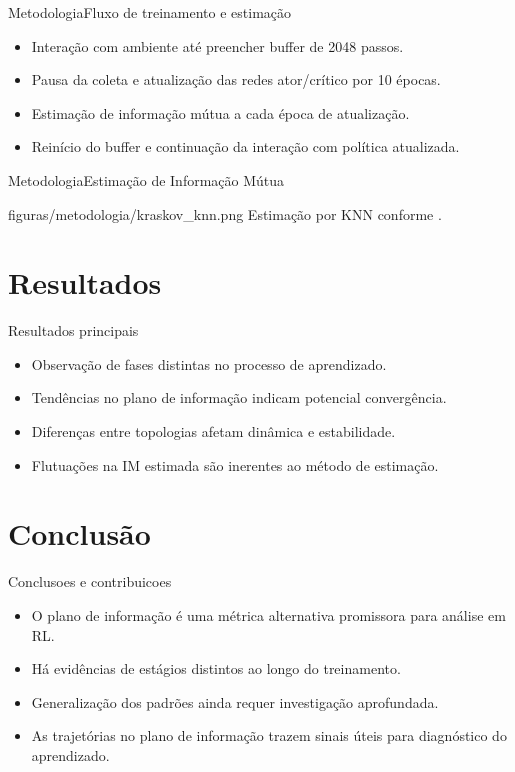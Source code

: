 \documentclass[
11pt,notheorems,hyperref={pdfauthor=Autor}
]{beamer}
\begin{document}
\begin{frame}{Metodologia}{Fluxo de treinamento e estimação}
\begin{itemize}
    \item Interação com ambiente até preencher buffer de 2048 passos.
    \item Pausa da coleta e atualização das redes ator/crítico por 10 épocas.
    \item Estimação de informação mútua a cada época de atualização.
    \item Reinício do buffer e continuação da interação com política atualizada.
\end{itemize}
\end{frame}

\begin{frame}{Metodologia}{Estimação de Informação Mútua}
    \centering
    \begin{minipage}{0.78\textwidth}
        \FigureWithFallbackCaption
        {figuras/metodologia/kraskov_knn.png}
        {Estimação por KNN conforme \textcite{kraskov2004estimating}.}
    \end{minipage}
\end{frame}

\section{Resultados}
\begin{frame}{Resultados principais}
\begin{itemize}
    \item Observação de fases distintas no processo de aprendizado.
    \item Tendências no plano de informação indicam potencial convergência.
    \item Diferenças entre topologias afetam dinâmica e estabilidade.
    \item Flutuações na IM estimada são inerentes ao método de estimação.
\end{itemize}
\end{frame}

\section{Conclusão}
\begin{frame}{Conclusoes e contribuicoes}
\begin{itemize}
    \item O plano de informação é uma métrica alternativa promissora para análise em RL.
    \item Há evidências de estágios distintos ao longo do treinamento.
    \item Generalização dos padrões ainda requer investigação aprofundada.
    \item As trajetórias no plano de informação trazem sinais úteis para diagnóstico do aprendizado.
\end{itemize}
\end{frame}
\end{document}
